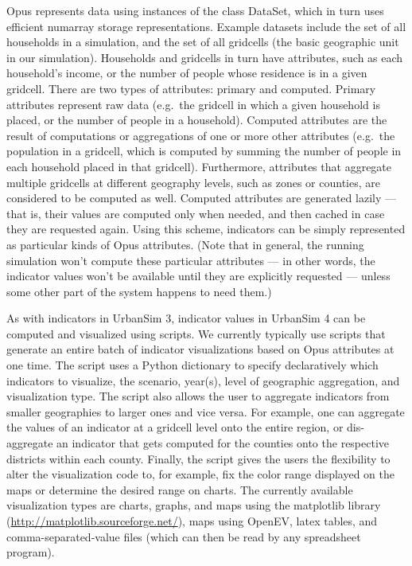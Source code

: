Opus represents data using instances of the class DataSet, which in turn
uses efficient numarray storage representations.  Example datasets include
the set of all households in a simulation, and the set of all gridcells
(the basic geographic unit in our simulation).  Households and gridcells in
turn have attributes, such as each household's income, or the number of
people whose residence is in a given gridcell.  There are two types of
attributes: primary and computed.  Primary attributes represent raw data
(e.g.\ the gridcell in which a given household is placed, or the number of
people in a household).  Computed attributes are the result of computations
or aggregations of one or more other attributes (e.g.\ the population in a
gridcell, which is computed by summing the number of people in each
household placed in that gridcell).  Furthermore, attributes that aggregate
multiple gridcells at different geography levels, such as zones or
counties, are considered to be computed as well.  Computed attributes are
generated lazily --- that is, their values are computed only when needed,
and then cached in case they are requested again.  Using this scheme,
indicators can be simply represented as particular kinds of Opus
attributes.  (Note that in general, the running simulation won't compute
these particular attributes --- in other words, the indicator values won't
be available until they are explicitly requested --- unless some other part
of the system happens to need them.)

As with indicators in UrbanSim 3, indicator values in UrbanSim 4 can be
computed and visualized using scripts.  We currently typically use scripts
that generate an entire batch of indicator visualizations based on Opus
attributes at one time.  The script uses a Python dictionary to specify
declaratively which indicators to visualize, the scenario, year(s), level
of geographic aggregation, and visualization type.  The script also allows
the user to aggregate indicators from smaller geographies to larger ones
and vice versa.  For example, one can aggregate the values of an indicator
at a gridcell level onto the entire region, or dis-aggregate an indicator
that gets computed for the counties onto the respective districts within
each county. Finally, the script gives the users the flexibility to alter
the visualization code to, for example, fix the color range displayed on
the maps or determine the desired range on charts.  The currently available
visualization types are charts, graphs, and maps using the matplotlib
library (\url{http://matplotlib.sourceforge.net/}), maps using OpenEV,
latex tables, and comma-separated-value files (which can then be read by
any spreadsheet program).

